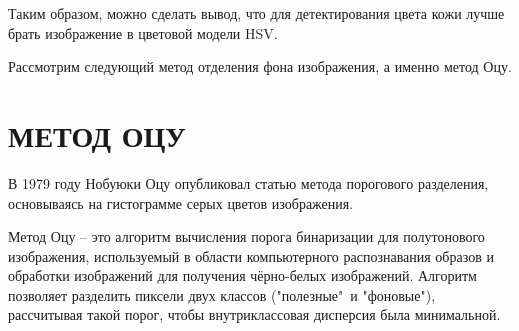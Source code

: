 Таким образом, можно сделать вывод, что для детектирования цвета кожи 
лучше брать изображение в цветовой модели HSV. 

Рассмотрим следующий метод отделения фона изображения, а именно метод
Оцу.

\newpage

\section{МЕТОД ОЦУ}

В 1979 году Нобуюки Оцу опубликовал статью \cite{otsu} метода порогового 
разделения, основываясь на гистограмме серых цветов изображения. 

Метод Оцу -- это алгоритм вычисления порога бинаризации для полутонового
изображения, используемый в области компьютерного распознавания образов
и обработки изображений для получения чёрно-белых изображений. Алгоритм
позволяет разделить пиксели двух классов ("полезные"\ и "фоновые"), 
рассчитывая такой порог, чтобы внутриклассовая дисперсия была
минимальной.

